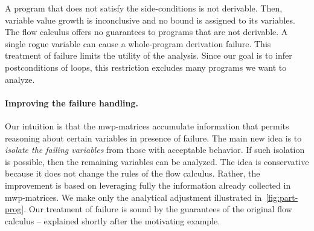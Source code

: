 A program that does not satisfy the side-conditions is not derivable.
Then, variable value growth is inconclusive and no bound is assigned to its variables.
The flow calculus offers no guarantees to programs that are not derivable.
A single rogue variable can cause a whole-program derivation failure.
This treatment of failure limits the utility of the analysis.
Since our goal is to infer postconditions of loops, this restriction excludes many programs we want to analyze.

\paragraph*{Improving the failure handling.}
Our intuition is that the mwp-matrices accumulate information that permits reasoning about {certain variables} in presence of failure.
The main new idea is to \emph{isolate the failing variables} from those with acceptable behavior.
If such isolation is possible, then the remaining variables can be analyzed.
The idea is conservative because it does not change the rules of the flow calculus.
Rather, the improvement is based on leveraging fully the information already collected in mwp-matrices.
We make only the analytical adjustment illustrated in~\autoref{fig:part-prog}.
Our treatment of failure is sound by the guarantees of the original flow calculus -- explained shortly after the motivating example.

